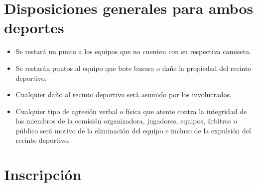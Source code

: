 	\section{Disposiciones generales para ambos deportes}

	\begin{itemize}
		\item Se restará un punto a los equipos que no cuenten con su respectiva camiseta.
		\item Se restarán puntos al equipo que bote basura o dañe la propiedad del recinto deportivo.
		\item Cualquier daño al recinto deportivo será asumido por los involucrados.
		\item Cualquier tipo de agresión verbal o física que atente contra la integridad de los miembros de la comisión organizadora, jugadores, equipos, árbitros o público será motivo de la eliminación del equipo e incluso de la expulsión del recinto deportivo.
	\end{itemize}

	\section{Inscripción}

